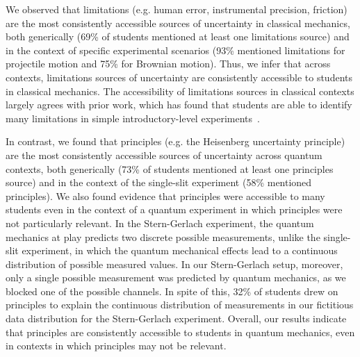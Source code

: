 \documentclass[english,aps,prstper,reprint,showpacs,longbibliography,superscriptaddress,nofootinbib]{revtex4-2}
\begin{document}
We observed that limitations (e.g. human error, instrumental precision, friction) are the most consistently accessible sources of uncertainty in classical mechanics, both generically (69\% of students mentioned at least one limitations source) and in the context of specific experimental scenarios (93\% mentioned limitations for projectile motion and 75\% for Brownian motion). %
Thus, we infer that across contexts, limitations sources of uncertainty are consistently accessible to students in classical mechanics. The accessibility of limitations sources in classical contexts largely agrees with prior work, which has found that students are able to identify many limitations in simple introductory-level experiments~\cite{Sere1993}.

In contrast, we found that principles (e.g. the Heisenberg uncertainty principle) are the most consistently accessible sources of uncertainty across quantum contexts, both generically (73\% of students mentioned at least one principles source) %
and in the context of the single-slit experiment (58\% mentioned principles). We also found evidence that principles were accessible to many students even in the context of a quantum experiment in which principles were not particularly relevant. In the Stern-Gerlach experiment, the quantum mechanics at play predicts two discrete possible measurements, unlike the single-slit experiment, in which the quantum mechanical effects lead to a continuous distribution of possible measured values. In our Stern-Gerlach setup, moreover, only a single possible measurement was predicted by quantum mechanics, as we blocked one of the possible channels. In spite of this, 32\% of students drew on principles to explain the continuous distribution of measurements in our fictitious data distribution for the Stern-Gerlach experiment. Overall, our results indicate that principles are consistently accessible to students in quantum mechanics, even in contexts in which principles may not be relevant. 
\end{document}

